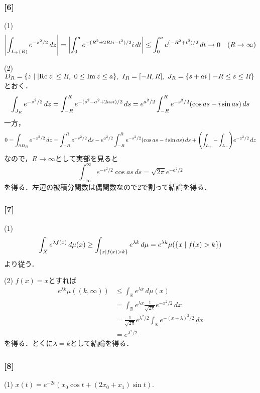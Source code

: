 \documentclass[a4j]{ltjsarticle}
\newcommand{\Rset}{\mathbb{R}}
\newcommand{\1}{\mathbbm{1}}
\numberwithin{equation}{section}
\theoremstyle{definition}
\begin{document}
\subsubsection*{[6]}
(1) 
\begin{equation}
    \abs{\int_{L_{\pm}(R)}e^{-z^2/2}\,dz}=\abs{\int_{0}^{a}e^{-(R^2\pm 2Rti-t^2)/2}i\,dt}\leq \int_{0}^{a}e^{(-R^2+t^2)/2}\,dt\to0\quad (R\to\infty)
\end{equation}

(2) $D_R=\qty{z\mid \abs{\Re z}\leq R,\ 0\leq \Im z\leq a},\ I_R=[-R,R],\ J_R=\qty{s+ai\mid -R\leq s\leq R}$とおく．
\begin{equation}
    \int_{J_R}e^{-z^2/2}\,dz=\int_{-R}^{R}e^{-(s^2-a^2+2asi)/2}\,ds=e^{a^2/2}\int_{-R}^{R}e^{-s^2/2}\qty(\cos as-i\sin as)\,ds
\end{equation}
一方，
\begin{equation}
    0=\int_{\partial D_R}e^{-z^2/2}\,dz=\int_{-R}^{R}e^{-s^2/2}\,ds-e^{a^2/2}\int_{-R}^{R} e^{-s^2/2}(\cos as-i\sin as)\,ds+\qty(\int_{L_+}-\int_{L_-})e^{-z^2/2}\,dz
\end{equation}
なので，$R\to\infty$として実部を見ると
\begin{equation}
    \int_{-\infty}^{\infty}e^{-s^2/2}\cos as\,ds=\sqrt{2\pi}e^{-a^2/2}
\end{equation}
を得る．左辺の被積分関数は偶関数なので2で割って結論を得る．

\subsubsection*{[7]} 
(1) 
\begin{equation}
    \int_{X}e^{\lambda f(x)}\,d\mu(x)\geq \int_{\qty{x\mid f(x)>k}}e^{\lambda k}\,d\mu =e^{\lambda k}\mu(\qty{x\mid f(x)>k})
\end{equation}
より従う．

(2) $f(x)=x$とすれば
\begin{align}
    e^{\lambda k}\mu((k,\infty))&\leq \int_{\Rset}e^{\lambda x}\,d\mu(x)\\
    &=\int_{\Rset}e^{\lambda x}\frac{1}{\sqrt{2\pi}} e^{-x^2/2}\,dx \\
    &=\frac{1}{\sqrt{2\pi}}e^{\lambda^2/2}\int_{\Rset}e^{-(x-\lambda)^2/2}\,dx  \\
    &=e^{\lambda^2/2}
\end{align}
を得る．とくに$\lambda=k$として結論を得る．

\subsubsection*{[8]}
(1) $x(t)=e^{-2t}(x_0\cos t+(2x_0+x_1)\sin t)$.
\end{document}
